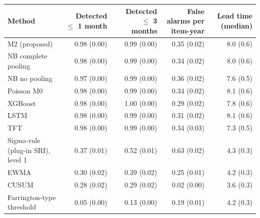 \documentclass[10pt,a4paper]{article}
\begin{document}

\clearpage

\noindent\begin{minipage}{\linewidth}
\label{tab:S1-1}
\centering\footnotesize
\begin{tabular}{lrrrr}
\toprule
Method & Detected $\le$ 1 month & Detected $\le$ 3 months & False alarms per item-year & Lead time (median) \\ \midrule
M2 (proposed) & 0.98 (0.00) & 0.99 (0.00) & 0.35 (0.02) & 8.0 (0.6) \\
NB complete pooling & 0.98 (0.00) & 0.99 (0.00) & 0.34 (0.02) & 8.0 (0.6) \\
NB no pooling & 0.97 (0.00) & 0.99 (0.00) & 0.36 (0.02) & 7.6 (0.5) \\
Poisson M0 & 0.98 (0.00) & 0.99 (0.00) & 0.34 (0.02) & 8.1 (0.6) \\
XGBoost & 0.98 (0.00) & 1.00 (0.00) & 0.29 (0.02) & 7.8 (0.6) \\
LSTM & 0.98 (0.00) & 0.99 (0.00) & 0.31 (0.02) & 8.1 (0.6) \\
TFT & 0.98 (0.00) & 0.99 (0.00) & 0.34 (0.03) & 7.3 (0.5) \\
Sigma-rule (plug-in SRI), level 1 & 0.37 (0.01) & 0.52 (0.01) & 0.63 (0.02) & 4.3 (0.3) \\
EWMA & 0.30 (0.02) & 0.39 (0.02) & 0.25 (0.01) & 4.2 (0.3) \\
CUSUM & 0.28 (0.02) & 0.29 (0.02) & 0.02 (0.00) & 3.6 (0.3) \\
Farrington-type threshold & 0.05 (0.00) & 0.13 (0.00) & 0.19 (0.01) & 4.2 (0.3) \\
\bottomrule
\end{tabular}
\end{minipage}
\vspace{22pt}
\end{document}
